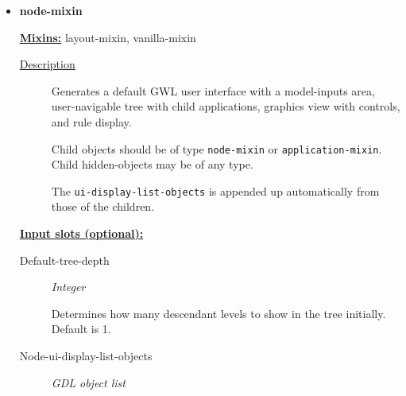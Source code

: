 \documentclass [11pt]{book}
\begin{document}
\begin{itemize}







\item {}
\label{prim:node-mixin}
\textbf{node-mixin}


\textbf{
\underline{Mixins:}} layout-mixin, vanilla-mixin





\begin{description}

\item [
\underline{Description}]


Generates a default GWL user interface with a model-inputs area,
user-navigable tree with child applications, graphics view with controls, and rule display. 

Child objects should be of type \texttt{node-mixin} or \texttt{application-mixin}. Child hidden-objects
may be of any type.

The \texttt{ui-display-list-objects} is appended up automatically from those of the children.



\end{description}








\textbf{
\underline{Input slots (optional):}}

\begin{description}

\item [Default-tree-depth]
\emph{Integer}

 Determines how many descendant levels to show in the tree initially. Default is 1.




\item [Node-ui-display-list-objects]
\emph{GDL object list}


\end{description}
\end{itemize}
\end{document}
